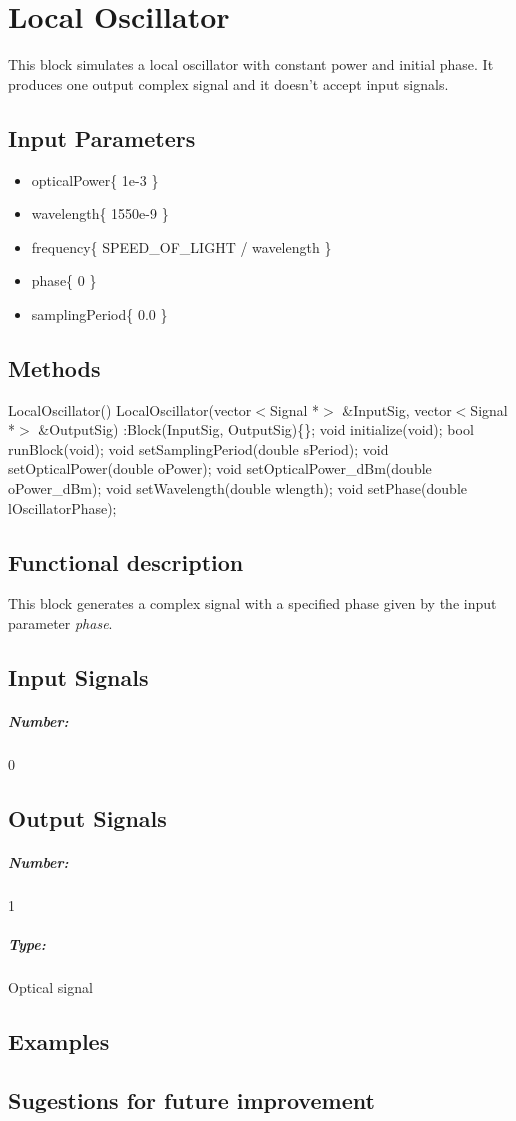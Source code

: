 \clearpage

\section{Local Oscillator}

This block simulates a local oscillator with constant power and initial phase. It produces one output complex signal and it doesn't accept input signals.

\subsection*{Input Parameters}

\begin{itemize}
	\item opticalPower\{ 1e-3 \}
	\item wavelength\{ 1550e-9 \}
	\item frequency\{ SPEED\_OF\_LIGHT / wavelength \}
	\item phase\{ 0 \}
	\item samplingPeriod\{ 0.0 \}
\end{itemize}

\subsection*{Methods}

LocalOscillator() {}
\bigbreak
LocalOscillator(vector$<$Signal *$>$ \&InputSig, vector$<$Signal *$>$ \&OutputSig) :Block(InputSig, OutputSig)\{\};
\bigbreak
void initialize(void);
\bigbreak
bool runBlock(void);
\bigbreak
void setSamplingPeriod(double sPeriod);
\bigbreak
void setOpticalPower(double oPower);
\bigbreak
void setOpticalPower\_dBm(double oPower\_dBm);
\bigbreak
void setWavelength(double wlength);
\bigbreak
void setPhase(double lOscillatorPhase);

\subsection*{Functional description}

This block generates a complex signal with a specified phase given by the input parameter \textit{phase}.

\pagebreak
\subsection*{Input Signals}

\subparagraph*{Number:} 0

\subsection*{Output Signals}

\subparagraph*{Number:} 1

\subparagraph*{Type:} Optical signal

\subsection*{Examples}

\subsection*{Sugestions for future improvement}


